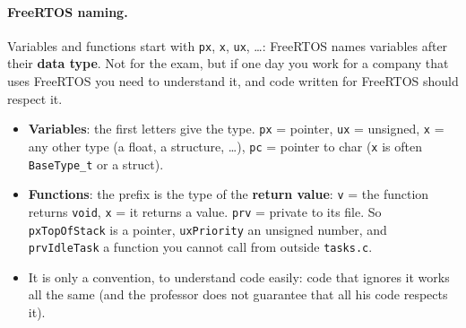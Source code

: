 \paragraph{FreeRTOS naming.} Variables and functions start with \texttt{px}, \texttt{x}, \texttt{ux}, \dots: FreeRTOS names variables after their \textbf{data type}. Not for the exam, but if one day you work for a company that uses FreeRTOS you need to understand it, and code written for FreeRTOS should respect it.
\begin{itemize}
    \item \textbf{Variables}: the first letters give the type. \texttt{px} = pointer, \texttt{ux} = unsigned, \texttt{x} = any other type (a float, a structure, \dots), \texttt{pc} = pointer to char (\texttt{x} is often \texttt{BaseType\_t} or a struct).
    \item \textbf{Functions}: the prefix is the type of the \textbf{return value}: \texttt{v} = the function returns \texttt{void}, \texttt{x} = it returns a value. \texttt{prv} = private to its file. So \texttt{pxTopOfStack} is a pointer, \texttt{uxPriority} an unsigned number, and \texttt{prvIdleTask} a function you cannot call from outside \texttt{tasks.c}.
    \item It is only a convention, to understand code easily: code that ignores it works all the same (and the professor does not guarantee that all his code respects it).
\end{itemize}

